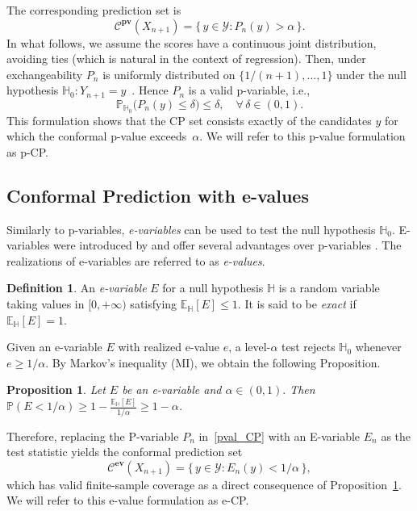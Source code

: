 \documentclass{article}
\theoremstyle{plain}
\newtheorem{proposition}[theorem]{Proposition}
\theoremstyle{definition}
\newtheorem{definition}[theorem]{Definition}
\theoremstyle{remark}
\begin{document}
The corresponding prediction set is
\begin{equation}
\label{pval_CP_set}
    \mathcal{C}^{\textbf{pv}}(X_{n+1}) = \{\, y \in \mathcal{Y} : P_{n}(y) > \alpha \,\}.
\end{equation}
In  what follows, we assume the scores have a continuous joint distribution, avoiding ties (which is natural in the context of regression). Then, under exchangeability $P_n$ is uniformly distributed on 
$\{1/(n+1), \dots, 1\}$ under the null hypothesis 
\(\mathbb{H}_0: Y_{n+1}=y\)~\citep{vovk2005algorithmic,lei2018distribution}. 
Hence $P_n$ is a valid p-variable, i.e.,
\[
\mathbb{P}_{\mathbb{H}_0}\big(P_n(y) \le \delta \big) \le \delta, 
\quad \forall\, \delta \in (0,1).
\]
This formulation shows that the CP set consists exactly of the candidates $y$ 
for which the conformal p-value exceeds~$\alpha$. We will refer to this p-value formulation as p-CP.


\subsection{Conformal Prediction with e-values}
\label{subsec:e-CP}
Similarly to p-variables, \emph{e-variables} can be used to test the null hypothesis $\mathbb{H}_0$. E-variables were introduced by \citet{vovk2021values} and offer several advantages over p-variables \citep{vovk2021values,vovk2024merging,wang2025only}. The realizations of e-variables are referred to as \emph{e-values}.

\begin{definition}\citep{vovk2021values,evaluespoly}
    An \emph{e-variable} $E$ for a null hypothesis $\mathbb{H}$ is a random variable taking values in \([0,+\infty)\) satisfying $\mathbb{E}_{\mathbb{H}}[E]\leq 1$. It is said to be \textit{exact} if $\mathbb{E}_{\mathbb{H}}[E]= 1$. 
\end{definition}
Given an e-variable \(E\) with realized e-value \(e\), a level-\(\alpha\) test rejects $\mathbb{H}_0$ whenever \(e \geq 1/\alpha\). By Markov’s inequality (MI), we obtain the following Proposition. 

\begin{proposition}
\label{Prop:markov_coverage}
Let $E$ be an e-variable and $\alpha\in(0,1).$ Then $\mathbb{P}(E < 1/\alpha)  \geq 1 - \frac{\mathbb{E}_{\mathbb{H}}[E]}{1/\alpha} \ge 1 - \alpha$.
\end{proposition}

Therefore, replacing the P-variable \(P_n\) in~\eqref{pval_CP} with an E-variable \(E_n\) as the test statistic yields the conformal prediction set  
\[
    \mathcal{C}^{\textbf{ev}}(X_{n+1})
    = \bigl\{\, y \in \mathcal{Y} : E_n(y) < 1/\alpha \,\bigr\},
\]
which has valid finite-sample coverage as a direct consequence of Proposition~\ref{Prop:markov_coverage}. We will refer to this e-value formulation as e-CP.
\end{document}
